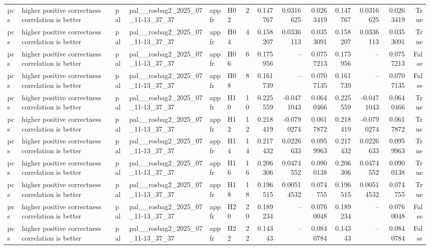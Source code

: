 \begin{longtable}{llllllrrrrrrrr}
pcs & higher positive correctness correlation is better & pal & pal\_\_rosbag2\_2025\_07\_11-13\_37\_37 & appfr & H02 & 2 & 0.147767 & 0.0316625 & 0.0263419 & 0.147767 & 0.0316625 & 0.0263419 & True \\
pcs & higher positive correctness correlation is better & pal & pal\_\_rosbag2\_2025\_07\_11-13\_37\_37 & appfr & H04 & 4 & 0.158207 & 0.0336113 & 0.0353091 & 0.158207 & 0.0336113 & 0.0353091 & True \\
pcs & higher positive correctness correlation is better & pal & pal\_\_rosbag2\_2025\_07\_11-13\_37\_37 & appfr & H06 & 6 & 0.175956 & -- & 0.0757213 & 0.175956 & -- & 0.0757213 & False \\
pcs & higher positive correctness correlation is better & pal & pal\_\_rosbag2\_2025\_07\_11-13\_37\_37 & appfr & H08 & 8 & 0.161739 & -- & 0.0707135 & 0.161739 & -- & 0.0707135 & False \\
pcs & higher positive correctness correlation is better & pal & pal\_\_rosbag2\_2025\_07\_11-13\_37\_37 & appfr & H10 & 10 & 0.225559 & -0.0471043 & 0.0640466 & 0.225559 & -0.0471043 & 0.0640466 & True \\
pcs & higher positive correctness correlation is better & pal & pal\_\_rosbag2\_2025\_07\_11-13\_37\_37 & appfr & H12 & 12 & 0.218419 & -0.0790274 & 0.0617872 & 0.218419 & -0.0790274 & 0.0617872 & True \\
pcs & higher positive correctness correlation is better & pal & pal\_\_rosbag2\_2025\_07\_11-13\_37\_37 & appfr & H14 & 14 & 0.217432 & 0.0226633 & 0.0959963 & 0.217432 & 0.0226633 & 0.0959963 & True \\
pcs & higher positive correctness correlation is better & pal & pal\_\_rosbag2\_2025\_07\_11-13\_37\_37 & appfr & H16 & 16 & 0.206306 & 0.0474552 & 0.0900138 & 0.206306 & 0.0474552 & 0.0900138 & True \\
pcs & higher positive correctness correlation is better & pal & pal\_\_rosbag2\_2025\_07\_11-13\_37\_37 & appfr & H18 & 18 & 0.196515 & 0.00514532 & 0.074755 & 0.196515 & 0.00514532 & 0.074755 & True \\
pcs & higher positive correctness correlation is better & pal & pal\_\_rosbag2\_2025\_07\_11-13\_37\_37 & appfr & H20 & 20 & 0.189234 & -- & 0.0760048 & 0.189234 & -- & 0.0760048 & False \\
pcs & higher positive correctness correlation is better & pal & pal\_\_rosbag2\_2025\_07\_11-13\_37\_37 & appfr & H22 & 22 & 0.14343 & -- & 0.0840784 & 0.14343 & -- & 0.0840784 & False \\

\end{longtable}
